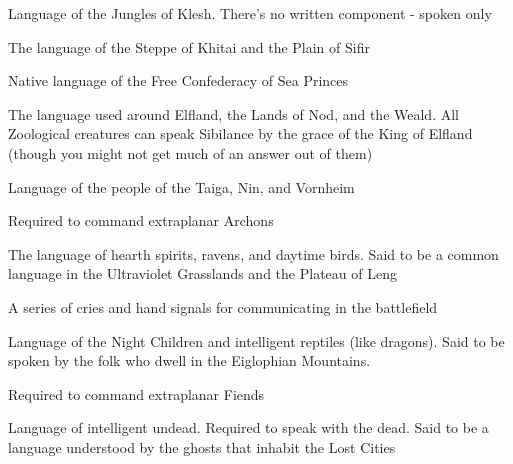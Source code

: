 {  \cbreak


  Language of the Jungles of Klesh. There's no written component - spoken only


  The language of the Steppe of Khitai and the Plain of Sifir


  Native language of the Free Confederacy of Sea Princes


  The language used around Elfland, the Lands of Nod, and the Weald.  All Zoological creatures can speak Sibilance by the grace of the King of Elfland (though you might not get much of an answer out of them)


  Language of the people of the Taiga, Nin, and Vornheim




Required to command extraplanar Archons


The language of hearth spirits, ravens, and daytime birds.  Said to be a common language in the Ultraviolet Grasslands and the Plateau of Leng


A series of cries and hand signals for communicating in the battlefield


Language of the Night Children and intelligent reptiles (like dragons).  Said to be spoken by the folk who dwell in the Eiglophian Mountains.


Required to command extraplanar Fiends


Language of intelligent undead.   Required to speak with the dead.  Said to be a language understood by the ghosts that inhabit the Lost Cities


}
